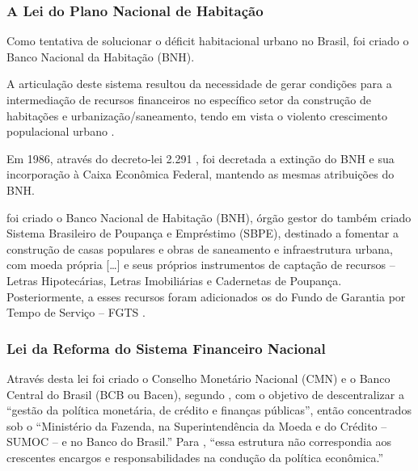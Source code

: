 \documentclass[
	10pt,				%
	openright,			%
	twoside,			%
	a5paper,			%
	english,			%
	french,				%
	spanish,			%
	brazil				%
	]{abntex2}
\renewenvironment{quote}
  {\small\list{}{\rightmargin=0.1cm \leftmargin=4cm}%
   \item\relax}
  {\endlist}
\begin{document}
\subsubsection{A Lei do Plano Nacional de
Habitação}\label{a-lei-do-plano-nacional-de-habitauxe7uxe3o}

Como tentativa de solucionar o déficit habitacional urbano no Brasil,
foi criado o Banco Nacional da Habitação (BNH).

\begin{quote}
A articulação deste sistema resultou da necessidade de gerar condições
para a intermediação de recursos financeiros no específico setor da
construção de habitações e urbanização/saneamento, tendo em vista o
violento crescimento populacional urbano \cite[p.~44]{fortuna2015}.
\end{quote}

Em 1986, através do decreto-lei 2.291 \cite{brasil1986}, foi decretada a
extinção do BNH e sua incorporação à Caixa Econômica Federal, mantendo
as mesmas atribuições do BNH.

\begin{quote}
foi criado o Banco Nacional de Habitação (BNH), órgão gestor do também
criado Sistema Brasileiro de Poupança e Empréstimo (SBPE), destinado a
fomentar a construção de casas populares e obras de saneamento e
infraestrutura urbana, com moeda própria {[}\ldots{}{]} e seus próprios
instrumentos de captação de recursos -- Letras Hipotecárias, Letras
Imobiliárias e Cadernetas de Poupança. Posteriormente, a esses recursos
foram adicionados os do Fundo de Garantia por Tempo de Serviço -- FGTS
\cite[p.~15]{fortuna2015}.
\end{quote}

\subsubsection{Lei da Reforma do Sistema Financeiro
Nacional}\label{lei-da-reforma-do-sistema-financeiro-nacional}

Através desta lei foi criado o Conselho Monetário Nacional (CMN) e o
Banco Central do Brasil (BCB ou Bacen), segundo
, com o objetivo de descentralizar a
``gestão da política monetária, de crédito e finanças públicas'', então
concentrados sob o ``Ministério da Fazenda, na Superintendência da Moeda
e do Crédito -- SUMOC -- e no Banco do Brasil.'' Para
, ``essa estrutura não correspondia aos
crescentes encargos e responsabilidades na condução da política
econômica.''
\end{document}
